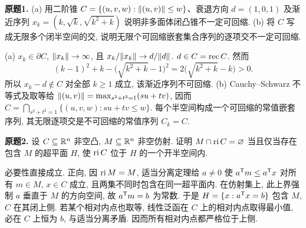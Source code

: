 \begin{exercise}\label{ass:6253-hw3-q1}
\textbf{原题1.} (a) 用二阶锥 $C=\{(u,v,w):\lVert (u,v)\rVert\le w\}$、衰退方向 $d=(1,0,1)$ 及渐近序列 $x_k=(k,\sqrt{k},\sqrt{k^2+k})$ 说明非多面体闭凸锥不一定可回缩.
(b) 将 $C$ 写成无限多个闭半空间的交, 说明无限个可回缩嵌套集合序列的逐项交不一定可回缩.
\end{exercise}
\begin{solution}
(a) $x_k\in\partial C$, $\lVert x_k\rVert\to\infty$, 且 $x_k/\lVert x_k\rVert\to d/\lVert d\rVert$. $d\in C=\operatorname{rec} C$. 然而
\[
(k-1)^2+k-\big(\sqrt{k^2+k}-1\big)^2
=2\big(\sqrt{k^2+k}-k\big)>0.
\]
所以 $x_k-d\notin C$ 对全部 $k\ge1$ 成立, 该渐近序列不可回缩.
(b) Cauchy--Schwarz 不等式及取等给
$\lVert (u,v)\rVert=\max_{s^2+t^2=1}(su+tv)$, 因而
$C=\bigcap_{s^2+t^2=1}\{(u,v,w):su+tv\le w\}$.
每个半空间构成一个可回缩的常值嵌套序列, 其无限逐项交是不可回缩的常值序列 $C_k=C$.
\end{solution}

\begin{exercise}\label{ass:6253-hw3-q2}
\textbf{原题2.} 设 $C\subseteq\mathbb R^n$ 非空凸, $M\subseteq\mathbb R^n$ 非空仿射. 证明 $M\cap\operatorname{ri} C=\varnothing$ 当且仅当存在包含 $M$ 的超平面 $H$, 使 $\operatorname{ri} C$ 位于 $H$ 的一个开半空间内.
\end{exercise}
\begin{solution}
必要性直接成立. 正向, 因 $\operatorname{ri} M=M$, 适当分离定理给 $a\ne0$ 使 $a^{\mathsf T} m\le a^{\mathsf T} x$ 对所有 $m\in M$, $x\in C$ 成立, 且两集不同时包含在同一超平面内. 在仿射集上, 此上界强制 $a$ 垂直于 $M$ 的方向空间, 故 $a^{\mathsf T} m=b$ 为常数. 于是 $H=\{x:a^{\mathsf T} x=b\}$ 包含 $M$, $C$ 在其闭上侧. 若某个相对内点也取等, 线性泛函在 $C$ 上的相对内点取得最小值, 必在 $C$ 上恒为 $b$, 与适当分离矛盾. 因而所有相对内点都严格位于上侧.
\end{solution}

